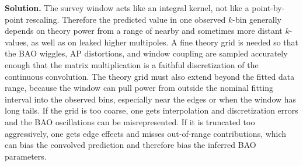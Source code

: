 \documentclass[11pt]{article}
\begin{document}
\bigskip
\textbf{Solution.}
The survey window acts like an integral kernel, not like a point-by-point rescaling. Therefore the predicted value in one observed $k$-bin generally depends on theory power from a range of nearby and sometimes more distant $k$-values, as well as on leaked higher multipoles. A fine theory grid is needed so that the BAO wiggles, AP distortions, and window coupling are sampled accurately enough that the matrix multiplication is a faithful discretization of the continuous convolution. The theory grid must also extend beyond the fitted data range, because the window can pull power from outside the nominal fitting interval into the observed bins, especially near the edges or when the window has long tails. If the grid is too coarse, one gets interpolation and discretization errors and the BAO oscillations can be misrepresented. If it is truncated too aggressively, one gets edge effects and misses out-of-range contributions, which can bias the convolved prediction and therefore bias the inferred BAO parameters.
\end{document}
